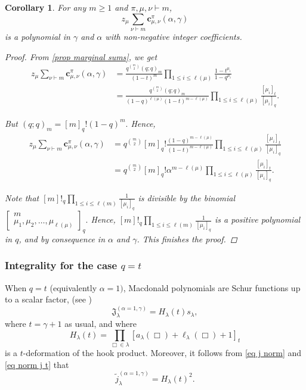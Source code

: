 \documentclass[12pt]{amsart}
\newtheorem{cor}[thm]{Corollary}
\theoremstyle{remark}
\newcommand{\bfc}{\boldsymbol{c}}
\begin{document}
\begin{cor}
For any $m\geq 1$ and $\pi,\mu,\nu\vdash m$,
$$z_\mu\sum_{\nu\vdash m} \bfc^\pi_{\mu,\nu}(\alpha,\gamma)$$
     is a polynomial  in $\gamma$ and $\alpha$ with non-negative integer coefficients.
     \begin{proof}
     From \cref{prop marginal sums}, we get
     \begin{align*}
       z_\mu\sum_{\nu\vdash m} \bfc^\pi_{\mu,\nu}(\alpha,\gamma)
       &=\frac{q^{\binom{m}{2}}(q;q)_m }{(1-t)^m}\prod_{1\leq i\leq \ell(\mu)}\frac{1-t^{\mu_i}}{1-q^{\mu_i}}  \\
       &=\frac{q^{\binom{m}{2}}(q;q)_m }{(1-q)^{\ell(\mu)}(1-t)^{m-\ell(\mu)}} \prod_{1\leq i\leq \ell(\mu)}\frac{[\mu_i]_t}{[\mu_i]_q}.
     \end{align*}
     
          But $(q;q)_m=[m]_q!(1-q)^m.$ Hence,
     \begin{align*}
       z_\mu\sum_{\nu\vdash m} \bfc^\pi_{\mu,\nu}(\alpha,\gamma)
       &=q^{\binom{m}{2}}[m]_q! \frac{(1-q)^{m-\ell(\mu)}}{(1-t)^{m-\ell(\mu)}} \prod_{1\leq i\leq \ell(\mu)}\frac{[\mu_i]_t}{[\mu_i]_q}\\
       &=q^{\binom{m}{2}}[m]_q! \alpha^{m-\ell(\mu)}\prod_{1\leq i\leq \ell(\mu)}\frac{[\mu_i]_t}{[\mu_i]_q}.
     \end{align*}

         Note that 
         $[m]!_q\prod_{1\leq i \leq\ell(m)}\frac{1}{[\mu_i]_q}$ is divisible by the binomial 
         $\left[\begin{array}{c}
              m  \\
              \mu_1,\mu_2,\dots,\mu_{\ell(\mu)}
         \end{array}\right]_q.$
         Hence, $[m]!_q\prod_{1\leq i \leq\ell(m)}\frac{1}{[\mu_i]_q}$ is a positive 
 polynomial in $q$, and by consequence in $\alpha$ and $\gamma$. This finishes the proof.
     \end{proof}
\end{cor}

\subsubsection{Integrality for the case $q=t$}

When $q=t$ (equivalently $\alpha=1)$, Macdonald polynomials are Schur functions up to a scalar factor, (see \cite[Chapter VI, Remark 8.4]{Macdonald1995})
$$\mathfrak J^{(\alpha=1,\gamma)}_\lambda=H_\lambda(t) s_\lambda,$$
where $t=\gamma+1$ as usual, and where 
$$H_\lambda(t)=\prod_{\Box\in \lambda} [a_\lambda(\Box)+\ell_\lambda(\Box)+1]_t $$
is a $t$-deformation of the hook product.
Moreover, it follows from \cref{eq j norm} and \cref{eq norm j t} that
$$\widetilde j^{(\alpha=1,\gamma)}_\lambda=H_\lambda(t)^2.$$
\end{document}
